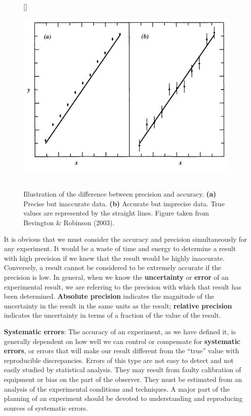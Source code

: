 \documentclass[a4paper,10pt]{article}
\begin{document}
\begin{figure}[h]
    [\FBwidth]
    {\caption{\footnotesize{\\Illustration of the difference between precision and accuracy. \textbf{(a)} Precise but inaccurate data. \textbf{(b)} Accurate but imprecise data. True values are represented by the straight lines. Figure taken from Bevington \& Robinson (2003).}}
    \label{fig:precisionaccuracy}}
    {\includegraphics[width=12cm]{figures/PrecisionAccuracy.png}}
\end{figure}

{\noindent}It is obvious that we must consider the accuracy and precision simultaneously for any experiment. It would be a waste of time and energy to determine a result with high precision if we knew that the result would be highly inaccurate. Conversely, a result cannot be considered to be extremely accurate if the precision is low. In general, when we know the \textbf{uncertainty} or \textbf{error} of an experimental result, we are referring to the precision with which that result has been determined. \textbf{Absolute precision} indicates the magnitude of the uncertainty in the result in the same units as the result; \textbf{relative precision} indicates the uncertainty in terms of a fraction of the value of the result.

{\noindent}\textbf{Systematic errors}: The accuracy of an experiment, as we have defined it, is generally dependent on how well we can control or compensate for \textbf{systematic errors}, or errors that will make our result different from the ``true'' value with reproducible discrepancies. Errors of this type are not easy to detect and not easily studied by statistical analysis. They may result from faulty calibration of equipment or bias on the part of the observer. They must be estimated from an analysis of the experimental conditions and techniques. A major part of the planning of an experiment should be devoted to understanding and reproducing sources of systematic errors.
\end{document}
